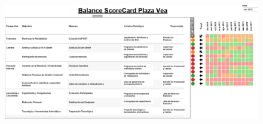 \begin{enumerate}[a)]
			\begin{figure}[htb]
				\begin{center}
					\includegraphics[width=17cm]{./Imagenes/13}
				\end{center}
			\end{figure}

    \end{enumerate}
	
	